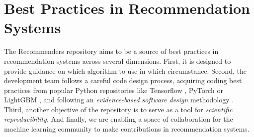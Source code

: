 \section{Best Practices in Recommendation Systems}

The Recommenders repository aims to be a source of best practices in recommendation systems
across several dimensions. First, it is designed to provide guidance on 
which algorithm to use in which circumstance. 
Second, the development team follows a careful code design process, acquiring 
coding best practices from popular Python repositories like Tensorflow 
\cite{abadi2016tensorflow}, PyTorch \cite{paszke2017automatic} or LightGBM 
\cite{ke2017lightgbm}, and following an {\em evidence-based software design} methodology 
\cite{joeglekar2018evidence}. Third, another objective of the repository
is to serve as a tool for {\em scientific reproducibility}. And finally, we are enabling a 
space of collaboration for the machine learning community to make
contributions in recommendation systems.






